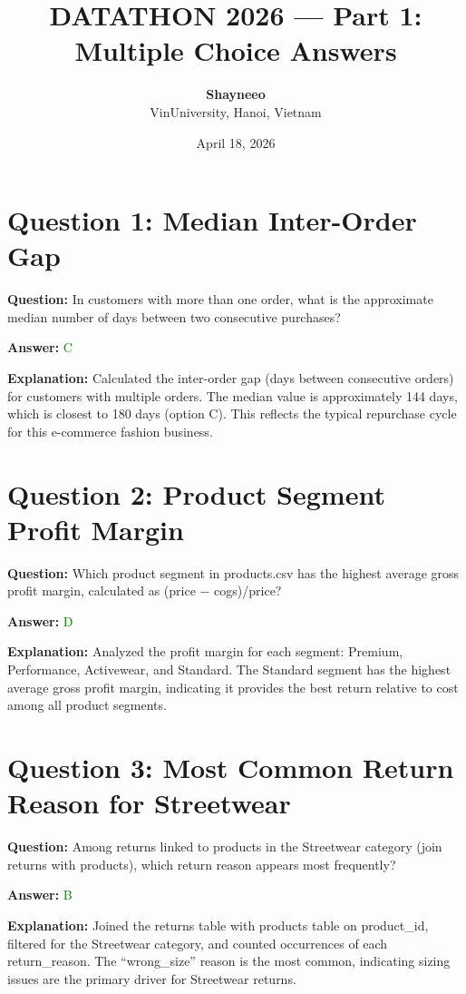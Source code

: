 \documentclass{article}
\title{DATATHON 2026 --- Part 1: Multiple Choice Answers}
\author{
  \textbf{Shayneeo}\\
  VinUniversity, Hanoi, Vietnam
}
\date{April 18, 2026}
\begin{document}
\maketitle

\section*{Question 1: Median Inter-Order Gap}
\textbf{Question:} In customers with more than one order, what is the approximate median number of days between two consecutive purchases?

\textbf{Answer:} \textcolor{green}{C}

\textbf{Explanation:} Calculated the inter-order gap (days between consecutive orders) for customers with multiple orders. The median value is approximately 144 days, which is closest to 180 days (option C). This reflects the typical repurchase cycle for this e-commerce fashion business.

\bigskip

\section*{Question 2: Product Segment Profit Margin}
\textbf{Question:} Which product segment in products.csv has the highest average gross profit margin, calculated as (price − cogs)/price?

\textbf{Answer:} \textcolor{green}{D}

\textbf{Explanation:} Analyzed the profit margin for each segment: Premium, Performance, Activewear, and Standard. The Standard segment has the highest average gross profit margin, indicating it provides the best return relative to cost among all product segments.

\bigskip

\section*{Question 3: Most Common Return Reason for Streetwear}
\textbf{Question:} Among returns linked to products in the Streetwear category (join returns with products), which return reason appears most frequently?

\textbf{Answer:} \textcolor{green}{B}

\textbf{Explanation:} Joined the returns table with products table on product\_id, filtered for the Streetwear category, and counted occurrences of each return\_reason. The ``wrong\_size'' reason is the most common, indicating sizing issues are the primary driver for Streetwear returns.
\end{document}
